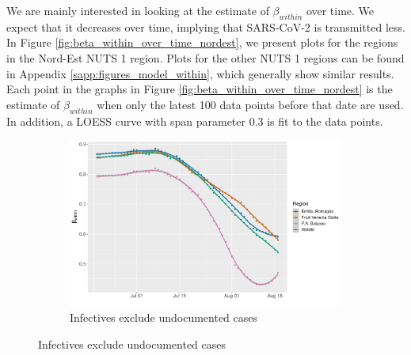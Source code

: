\documentclass[12pt]{article}
\begin{document}
	We are mainly interested in looking at the estimate of $\beta_{within}$ over time. We expect that it decreases over time, implying that SARS-CoV-2 is transmitted less. In Figure \ref{fig:beta_within_over_time_nordest}, we present plots for the regions in the Nord-Est NUTS 1 region. Plots for the other NUTS 1 regions can be found in Appendix \ref{sapp:figures_model_within}, which generally show similar results. Each point in the graphs in Figure \ref{fig:beta_within_over_time_nordest} is the estimate of $\beta_{within}$ when only the latest 100 data points before that date are used. In addition, a LOESS curve with span parameter 0.3 is fit to the data points. \\
	
	\begin{figure}[H]
	    \centering
	    \begin{subfigure}{\textwidth}
	      \centering
	      \includegraphics[width=0.94\linewidth]{output/model_within_lag14_betawithin_Nord-Est_rolling.pdf}
	      \caption{Infectives exclude undocumented cases}
	      \label{fig:beta_within_over_time_nordest_regular}
	    \end{subfigure}
    \end{figure}
\end{document}

